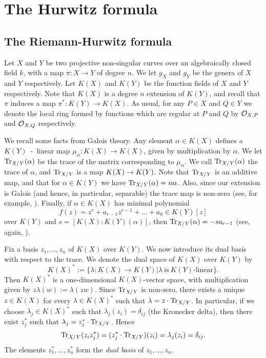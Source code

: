 \chapter{The Hurwitz formula} \label{Chapter:hurwitzformula}
\section{The Riemann-Hurwitz formula}\label{Hurwitzsection}

Let $X$ and $Y$ be two projective non-singular curves over an algebraically closed field $k$, with a map $\pi \colon X \rightarrow Y$ of degree $n$.
We let $g_X$ and $g_Y$ be the genera of $X$ and $Y$ respectively.
Let $K(X)$ and $K(Y)$ be the function fields of $X$ and $Y$ respectively.
Note that $K(X)$ is a degree $n$ extension of $K(Y)$, and recall that $\pi$ induces a map $\pi^*\colon K(Y) \rightarrow K(X)$.
As usual, for any $P \in X$ and $Q \in Y$ we denote the local ring formed by functions which are regular at $P$ and $Q$ by ${\cal O}_{X,P}$ and ${\cal O}_{X,Q}$ respectively.

We recall some facts from Galois theory.
Any element $\alpha \in K(X)$ defines a $K(Y)$~-~linear map $\mu_{\alpha} \colon  K(X) \rightarrow K(X)$, given by multiplication by $\alpha$.
We let $\operatorname{Tr}_{X/Y}(\alpha)$ be the trace of the matrix corresponding to $\mu_\alpha$.
We call $\operatorname{Tr}_{X/Y}(\alpha)$ the trace of $\alpha$, and $\operatorname{Tr}_{X/Y}$ is a map $K(X) \rightarrow K(Y)$.
Note that $\operatorname{Tr}_{X/Y}$ is an additive map, and that for $\alpha \in K(Y)$ we have $\operatorname{Tr}_{X/Y}(\alpha) = n \alpha$.
Also, since our extension is Galois (and hence, in particular, separable) the trace map is non-zero (see, for example, \cite[Appendix A]{stichtenoth}).
Finally, if $\alpha \in K(X)$ has minimal polynomial 
\[
 f(z) = z^r + a_{r-1}z^{r-1} + \ldots +a_0 \in K(Y)[z]
\]
 over $K(Y)$ and $s= [K(X):K(Y)(\alpha)]$, then $\operatorname{Tr}_{X/Y}(\alpha) = -sa_{r-1}$ (see, again, \cite[Appendix A]{stichtenoth}).

Fix a basis $z_1,\ldots,z_n$ of $K(X)$ over $K(Y)$.
We now introduce its dual basis with respect to the trace.
We denote the dual space of $K(X)$ over $K(Y)$ by 
\[
K(X)^*:=\{\lambda \colon K(X) \rightarrow K(Y)| \lambda\ \text{is}\ K(Y)\text{-linear}\}.
\]
Then $K(X)^*$ is a one-dimensional $K(X)$-vector space, with multiplication given by $z\lambda(w) := \lambda(zw)$.
Since $\operatorname{Tr}_{X/Y}$ is non-zero, there exists a unique $z\in K(X)$ for every $\lambda \in K(X)^*$ such that $\lambda = z\cdot \operatorname{Tr}_{X/Y}$.
In particular, if we choose $\lambda_j\in K(X)^*$ such that $\lambda_j(z_i) = \delta_{ij}$ (the Kronecker delta), then there exist $z_j^*$ such that $\lambda_j = z_j^*\cdot \operatorname{Tr}_{X/Y}$.
Hence
\[
 \operatorname{Tr}_{X/Y}(z_iz_j^*) = (z_j^*\cdot \operatorname{Tr}_{X/Y})(z_i) = \lambda_j(z_i) = \delta_{ij}.
\]
The elements $z_1^*, \ldots , z_n^*$ form the {\em dual basis} of $z_1, \ldots , z_n$.

